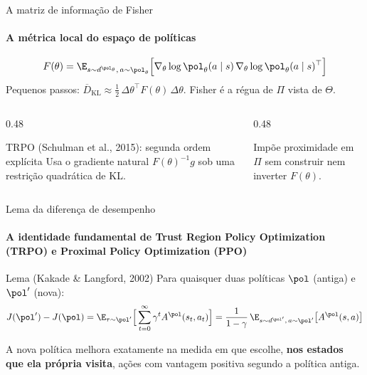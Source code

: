 \documentclass[aspectratio=169, 11pt]{beamer}
\newcommand{\KLbar}{\overline{D}_{\mathrm{KL}}}
\begin{document}
\begin{frame}{A matriz de informação de Fisher}
  \framesubtitle{A métrica local do espaço de políticas}

  \begin{defbox}{}
    \[
      F(\theta) = \E_{s\sim d^{\pol_\theta},\,a\sim\pol_\theta}\Big[\nabla_\theta\log\pol_\theta(a\mid s)\,
        \nabla_\theta\log\pol_\theta(a\mid s)^\top\Big]
    \]
    Pequenos passos: $\KLbar\approx\tfrac12\,\Delta\theta^\top F(\theta)\,\Delta\theta$.
    Fisher é a régua de $\Pi$ vista de $\Theta$.
  \end{defbox}

  \begin{columns}[T]
    \begin{column}{0.48\textwidth}
      \begin{teobox}{TRPO (Schulman et al., 2015): segunda ordem explícita}
        \small Usa o gradiente natural $F(\theta)^{-1}g$ sob uma restrição quadrática de KL.
      \end{teobox}
    \end{column}
    \begin{column}{0.48\textwidth}
      \begin{exbox}[title={PPO (Schulman et al., 2017): apenas primeira ordem}]{}
        \small Impõe proximidade em $\Pi$ sem construir nem inverter $F(\theta)$.
      \end{exbox}
    \end{column}
  \end{columns}
\end{frame}

\begin{frame}{Lema da diferença de desempenho}
  \framesubtitle{A identidade fundamental de Trust Region Policy Optimization (TRPO) e Proximal Policy Optimization (PPO)}

  \begin{teobox}{Lema (Kakade \& Langford, 2002)}
    Para quaisquer duas políticas $\pol$ (antiga) e $\pol'$ (nova):
    \[
      J(\pol') - J(\pol) = \E_{\tau\sim\pol'}\Big[\sum_{t=0}^{\infty}\gamma^t A^{\pol}(s_t,a_t)\Big]
        = \frac{1}{1-\gamma}\,\E_{s\sim d^{\pol'},\,a\sim\pol'}\big[A^{\pol}(s,a)\big]
    \]
  \end{teobox}

  \begin{ideiabox}
    A nova política melhora exatamente na medida em que escolhe, \textbf{nos estados que ela própria visita},
    ações com vantagem positiva segundo a política antiga.
  \end{ideiabox}
\end{frame}
\end{document}
